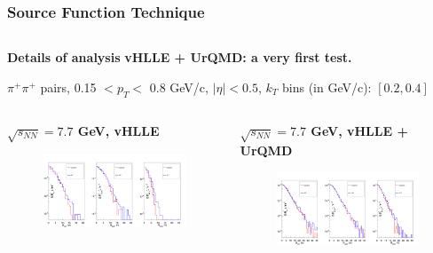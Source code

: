 \documentclass[dvipsnames] {beamer}
\begin{document}
\begin{frame}[shrink=50]
  \frametitle{Source Function Technique}
  \begin{columns}
    \begin{block}{\bf \centering Details of analysis}
      \bf \centering 
      vHLLE + UrQMD: a very first test.
      
      $\pi^{+}\pi^{+}$ pairs,       
      0.15 $ < p_{T} < $ 0.8 GeV/c, 
      $|\eta| < 0.5$,
      $k_{T}$ bins (in GeV/c): $[0.2, 0.4]$
      
    \end{block}
  \end{columns}
  \begin{columns}
    \begin{block}{\bf  \centering $\sqrt{s_{NN}} = 7.7$ GeV, vHLLE}
      \begin{figure}[H]
         \includegraphics[width=.95\linewidth]{SF_vHLLE_77gev.png}
      \end{figure}
    \end{block}
    \begin{block}{\bf  \centering $\sqrt{s_{NN}} = 7.7$ GeV, vHLLE + UrQMD}
      \begin{figure}[H]
        \includegraphics[width=.95\linewidth]{SF_vHLLE_UrQMD_77gev.png} \\

\end{figure}
\end{block}
\end{columns}
\end{frame}
\end{document}
